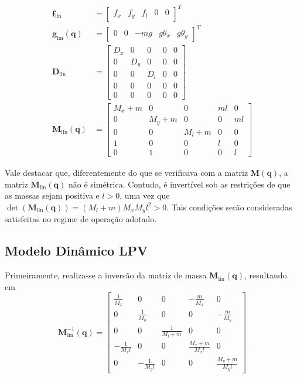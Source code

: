 \documentclass{ppgeesa}
\begin{document}
{\allowdisplaybreaks
\begin{align}
\mathbf{f}_{\text{lin}} &= \begin{bmatrix} f_x & f_y & f_l & 0 & 0 \end{bmatrix}^T \\
\mathbf{g}_{\text{lin}}(\mathbf{q}) &= \begin{bmatrix} 0 & 0 & -mg & g\theta_x & g\theta_y \end{bmatrix}^T \\
\mathbf{D}_{\text{lin}} &= \begin{bmatrix}
D_x & 0 & 0 & 0 & 0 \\
0 & D_y & 0 & 0 & 0 \\
0 & 0 & D_l & 0 & 0 \\
0 & 0 & 0 & 0 & 0 \\
0 & 0 & 0 & 0 & 0
\end{bmatrix} \\
\mathbf{M}_{\text{lin}}(\mathbf{q}) &= \begin{bmatrix}
M_x + m & 0 & 0 & ml & 0 \\
0 & M_y + m & 0 & 0 & ml \\
0 & 0 & M_l + m & 0 & 0 \\
1 & 0 & 0 & l & 0 \\
0 & 1 & 0 & 0 & l
\end{bmatrix} \label{eq:Mlin}
\end{align}
}

Vale destacar que, diferentemente do que se verificava com a matriz $\mathbf{M}(\mathbf{q})$, a matriz $\mathbf{M}_{\text{lin}}(\mathbf{q})$ não é simétrica. Contudo, é invertível sob as restrições de que as massas sejam positiva e $l>0$, uma vez que $\det(\mathbf{M}_{\text{lin}}(\mathbf{q})) = (M_l+m)M_xM_yl^2 > 0$. Tais condições serão consideradas satisfeitas no regime de operação adotado.

\subsection{Modelo Dinâmico LPV}

Primeiramente, realiza-se a inversão da matriz de massa $\mathbf{M}_{\text{lin}}(\mathbf{q})$, resultando em
\begin{equation}
\mathbf{M}_{\text{lin}}^{-1}(\mathbf{q}) = \begin{bmatrix}
\frac{1}{M_x} & 0 & 0 & -\frac{m}{M_x} & 0 \\[6pt]
0 & \frac{1}{M_y} & 0 & 0 & -\frac{m}{M_y} \\[6pt]
0 & 0 & \frac{1}{M_l + m} & 0 & 0 \\[6pt]
-\frac{1}{M_x l} & 0 & 0 & \frac{M_x + m}{M_x l} & 0 \\[6pt]
0 & -\frac{1}{M_y l} & 0 & 0 & \frac{M_y + m}{M_y l}
\end{bmatrix} \label{eq:Mlin-1}
\end{equation}
\end{document}
